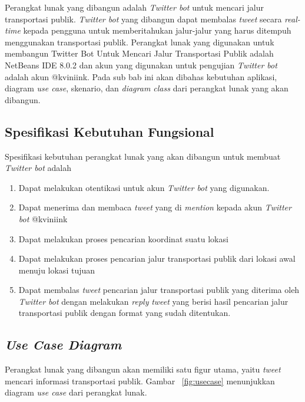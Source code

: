 Perangkat lunak yang dibangun adalah \textit{Twitter bot} untuk mencari jalur transportasi publik. \textit{Twitter bot} yang dibangun dapat membalas \textit{tweet} secara \textit{real-time} kepada pengguna untuk memberitahukan jalur-jalur yang harus ditempuh menggunakan transportasi publik. Perangkat lunak yang digunakan untuk membangun Twitter Bot Untuk Mencari Jalur Transportasi Publik adalah NetBeans IDE 8.0.2 dan akun yang digunakan untuk pengujian \textit{Twitter bot} adalah akun @kviniink. Pada sub bab ini akan dibahas kebutuhan aplikasi, diagram \textit{use case}, skenario, dan\textit{ diagram class} dari perangkat lunak yang akan dibangun.

\subsection{Spesifikasi Kebutuhan Fungsional}
Spesifikasi kebutuhan perangkat lunak yang akan dibangun untuk membuat \textit{Twitter bot} adalah
\begin{enumerate}
	\item Dapat melakukan otentikasi untuk akun \textit{Twitter bot} yang digunakan.
	\item Dapat menerima dan membaca \textit{tweet} yang di \textit{mention} kepada akun \textit{Twitter bot} @kviniink
	\item Dapat melakukan proses pencarian koordinat suatu lokasi
	\item Dapat melakukan proses pencarian jalur transportasi publik dari lokasi awal menuju lokasi tujuan
	\item Dapat membalas \textit{tweet} pencarian jalur transportasi publik yang diterima oleh \textit{Twitter bot} dengan melakukan \textit{reply} \textit{tweet} yang berisi hasil pencarian jalur transportasi publik dengan format yang sudah ditentukan.
\end{enumerate}

\subsection{\textit{Use Case Diagram}}
Perangkat lunak yang dibangun akan memiliki satu figur utama, yaitu \textit{tweet} mencari informasi transportasi publik. Gambar ~\ref{fig:usecase} menunjukkan diagram \textit{use case} dari perangkat lunak.

